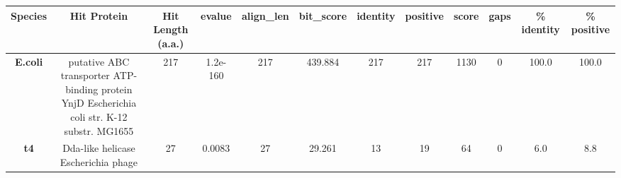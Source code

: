 \begin{tabular}{|c|c|c|c|c|c|c|c|c|c|c|c|} \hline
\textbf{Species} & \textbf{Hit Protein} & \textbf{Hit Length (a.a.)} & \textbf{evalue} & \textbf{align\_len} & \textbf{bit\_score} & \textbf{identity} & \textbf{positive} & \textbf{score} & \textbf{gaps} & \textbf{\% identity} & \textbf{\% positive} \\ \hline
\textbf{E.coli} & putative ABC transporter ATP-binding protein YnjD Escherichia coli str. K-12 substr. MG1655 & 217 & 1.2e-160 & 217 & 439.884 & 217 & 217 & 1130 & 0 & 100.0 & 100.0\\
\textbf{t4} & Dda-like helicase Escherichia phage  & 27 & 0.0083 & 27 & 29.261 & 13 & 19 & 64 & 0 & 6.0 & 8.8\\
\hline \end{tabular}
